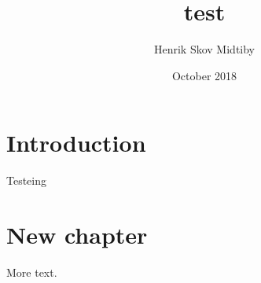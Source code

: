 \documentclass{article}
\title{test}
\author{Henrik Skov Midtiby}
\date{October 2018}
\begin{document}
\maketitle

\section{Introduction}


Testeing 

\section{New chapter}

More text.
\end{document}
